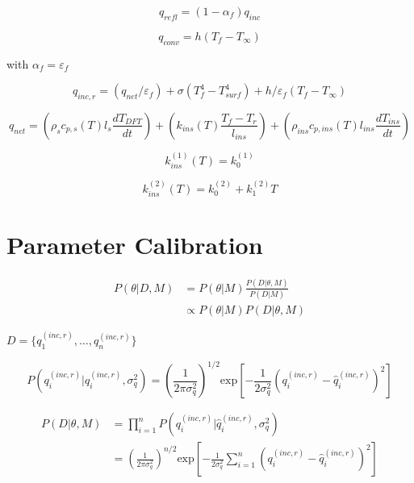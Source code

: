 \documentclass[article]{proc}
\begin{document}
\begin{equation}\label{eq:q_refl}
    q_{refl} = (1 - \alpha_f)q_{inc}
\end{equation}

\begin{equation}\label{eq:q_conv}
    q_{conv} = h (T_f - T_{\infty})
\end{equation}

\noindent with $\alpha_f = \varepsilon_f$

\begin{equation}\label{eq:q_inc}
    q_{inc,r} = (q_{net}/\varepsilon_f) + \sigma (T_f^4 - T_{surf}^4) + h/\varepsilon_f (T_f - T_{\infty})
\end{equation}

\begin{equation}\label{eq:esm}
    q_{net} = \left(\rho_s c_{p,s}(T) l_s \frac{dT_{DFT}}{dt} \right) + \left( k_{ins}(T) \frac{T_f - T_r}{l_{ins}} \right) + \left(\rho_{ins} c_{p,ins}(T) l_{ins} \frac{dT_{ins}}{dt}\right)
\end{equation}

\begin{equation}\label{eq:k_ins_1}
    k_{ins}^{(1)}(T) = k_0^{(1)}
\end{equation}

\begin{equation}\label{eq:k_ins_2}
    k_{ins}^{(2)}(T) = k^{(2)}_0 + k^{(2)}_1 T
\end{equation}

\section{Parameter Calibration}

\begin{align}\label{eq:bayes}
    P(\theta | D, M) &= P(\theta|M) \frac{P(D|\theta, M)}{P(D|M)}\\
        &\propto P(\theta|M) P(D|\theta, M)
\end{align}

\noindent $D = \{q^{(inc,r)}_1, \dots, q^{(inc,r)}_n \}$

\begin{equation}\label{eq:likelihood}
    P(q_i^{(inc,r)}| \hat{q}_i^{(inc,r)}, \sigma_q^2) = \left(\frac{1}{2 \pi \sigma_q^2} \right)^{1/2} \text{exp} \left[-\frac{1}{2 \sigma_q^2} \left( q_i^{(inc,r)} - \hat{q}_i^{(inc,r)} \right)^2 \right]
\end{equation}

\begin{align}\label{eq:likelihood_2}
    P(D| \theta, M) &= \prod_{i=1}^n P(q_i^{(inc,r)}| \hat{q}_i^{(inc,r)}, \sigma_q^2) \\
    &= \left(\frac{1}{2 \pi \sigma_q^2} \right)^{n/2} \text{exp} \left[-\frac{1}{2 \sigma_q^2} \sum_{i=1}^n \left(q_i^{(inc,r)} - \hat{q}_i^{(inc,r)} \right)^2 \right]
\end{align}
\end{document}
